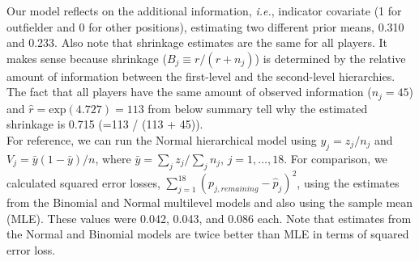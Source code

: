 \documentclass[article]{jss}
\begin{document}
Our model reflects on the additional information, \emph{i.e.}, indicator covariate (1 for outfielder and 0 for other positions), estimating two different prior means, 0.310 and 0.233. Also note that shrinkage estimates are the same for all players. It makes sense because shrinkage ($B_{j}\equiv r / (r+n_{j})$) is determined by the relative amount of information between the first-level and the second-level hierarchies. The fact that all players have the same amount of observed information ($n_{j}=45$) and $\hat{r}=\textrm{exp}(4.727)=113$ from below summary tell why the estimated shrinkage is 0.715 (=113 / (113 + 45)).
\\

For reference, we can run the Normal hierarchical model using $y_{j}=z_{j} / n_{j}$ and $V_{j}=\bar{y}(1-\bar{y})/n$, where $\bar{y}=\sum_{j} z_{j} / \sum_{j} n_{j}$, $j=1,\ldots, 18$. For comparison, we calculated squared error losses, $\sum_{j=1}^{18}(p_{j, remaining}-\hat{p}_{j})^{2}$, using the estimates from the Binomial and Normal multilevel models and also using the sample mean (MLE). These values were 0.042, 0.043, and 0.086 each. Note that estimates from the Normal and Binomial models are twice better than MLE in terms of squared error loss. 
\\
\end{document}
